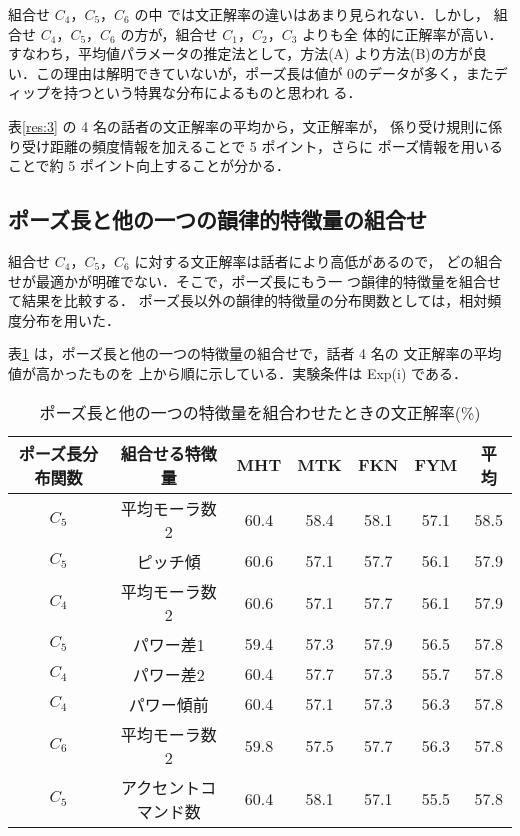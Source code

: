 組合せ $C_4$，$C_5$，$C_6$ の中
では文正解率の違いはあまり見られない．しかし，
組合せ $C_4$，$C_5$，$C_6$ の方が，組合せ $C_1$，$C_2$，$C_3$ よりも全
体的に正解率が高い．すなわち，平均値パラメータの推定法として，方法(A)
より方法(B)の方が良い．この理由は解明できていないが，ポーズ長は値が
0のデータが多く，またディップを持つという特異な分布によるものと思われ
る．

表\ref{res:3} の 4 名の話者の文正解率の平均から，文正解率が，
係り受け規則に係り受け距離の頻度情報を加えることで 5 ポイント，さらに
ポーズ情報を用いることで約 5 ポイント向上することが分かる．

\subsection{ポーズ長と他の一つの韻律的特徴量の組合せ}

組合せ $C_4$，$C_5$，$C_6$ に対する文正解率は話者により高低があるので，
どの組合せが最適かが明確でない．そこで，ポーズ長にもう一
つ韻律的特徴量を組合せて結果を比較する．
ポーズ長以外の韻律的特徴量の分布関数としては，相対頻度分布を用いた．

表\ref{res:4} は，ポーズ長と他の一つの特徴量の組合せで，話者 4 名の
文正解率の平均値が高かったものを
上から順に示している．実験条件は Exp(i) である．


\begin{table}
\begin{center}
\caption{ポーズ長と他の一つの特徴量を組合わせたときの文正解率(\%)}
\label{res:4}
\begin{tabular}{|c|c||c|c|c|c|c|}
\hline
ポーズ長分布関数  & 組合せる特徴量 &MHT &MTK &FKN &FYM  &平均\\
\hline
\hline
$C_5$	&平均モーラ数2	&
     60.4 & 58.4 & 58.1 & 57.1	&58.5\\
$C_5$	&ピッチ傾	&
     60.6 & 57.1 & 57.7 & 56.1	&57.9\\
$C_4$	&平均モーラ数2	&
     60.6 & 57.1 & 57.7 & 56.1	&57.9\\
$C_5$	&パワー差1	&
     59.4 & 57.3 & 57.9 & 56.5	&57.8\\
$C_4$	&パワー差2	&
     60.4 & 57.7 & 57.3 & 55.7	&57.8\\
$C_4$	&パワー傾前	&
     60.4 & 57.1 & 57.3 & 56.3	&57.8\\
$C_6$	&平均モーラ数2	&
     59.8 & 57.5 & 57.7 & 56.3	&57.8\\
$C_5$	&アクセントコマンド数&
     60.4 & 58.1 & 57.1 & 55.5	&57.8\\
\hline
\end{tabular}
\end{center}
\end{table}

